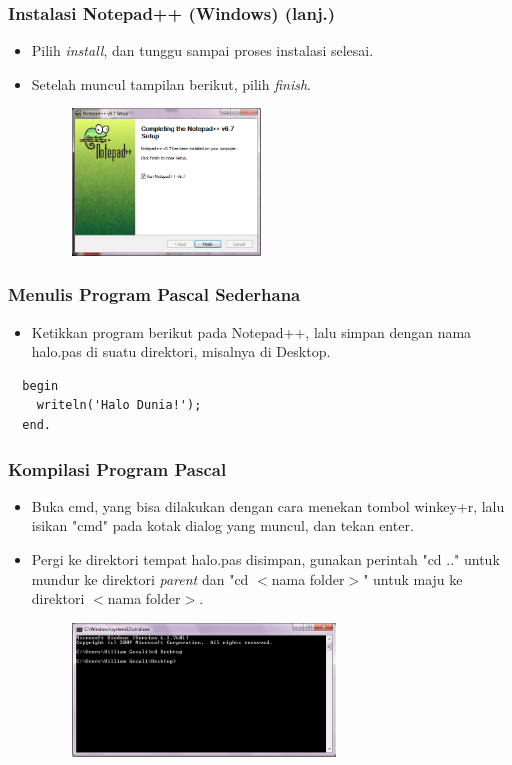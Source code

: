 \documentclass{beamer}
\begin{document}
\begin{frame}
\frametitle{Instalasi Notepad++ (Windows) (lanj.)}
\begin{itemize}
  \item Pilih \textit{install}, dan tunggu sampai proses instalasi selesai.
  \item Setelah muncul tampilan berikut, pilih \textit{finish}.
  \begin{figure}
    \includegraphics[width=5cm]{asset/npp_9.PNG}
  \end{figure}
\end{itemize}
\end{frame}

\begin{frame}[fragile]
\frametitle{Menulis Program Pascal Sederhana}
\begin{itemize}
  \item Ketikkan program berikut pada Notepad++, lalu simpan dengan nama halo.pas di suatu direktori, misalnya di Desktop.
\end{itemize}
\begin{lstlisting}
  begin
    writeln('Halo Dunia!');
  end.
\end{lstlisting}
\end{frame}

\begin{frame}
\frametitle{Kompilasi Program Pascal}
\begin{itemize}
  \item Buka cmd, yang bisa dilakukan dengan cara menekan tombol winkey+r, lalu isikan "cmd" pada kotak dialog yang muncul, dan tekan enter.
  \item Pergi ke direktori tempat halo.pas disimpan, gunakan perintah "cd .." untuk mundur ke direktori \textit{parent} dan "cd $<$nama folder$>$" untuk maju ke direktori $<$nama folder$>$.
  \begin{figure}
    \includegraphics[width=7cm]{asset/hello_2.PNG}
  \end{figure}
\end{itemize}
\end{frame}
\end{document}
